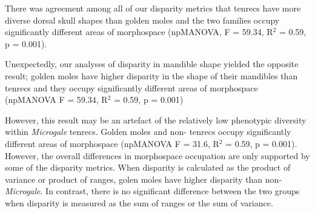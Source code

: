 \documentclass[12pt,a4paper]{article}
\begin{document}
There was agreement among all of our disparity metrics that tenrecs have more diverse dorsal skull shapes than golden moles and the two families occupy significantly different areas of morphospace (npMANOVA, F = 59.34, R$^2 $ = 0.59, p = 0.001). 



Unexpectedly, our analyses of disparity in mandible shape yielded the opposite result; golden moles have higher disparity in the shape of their mandibles than tenrecs and they occupy significantly different areas of morphospace (npMANOVA F = 59.34, R$^2$ = 0.59, p =	0.001)  

However, this result may be an artefact of the relatively low phenotypic diversity within \textit{Microgale} tenrecs. Golden moles and non- tenrecs occupy significantly different areas of morphospace (npMANOVA F = 31.6, R$^2$ = 0.59, p =	0.001). However, the overall differences in morphospace occupation are only supported by some of the disparity metrics. When disparity is calculated as the product of variance or product of ranges, golen moles have higher disparity than non-\textit{Microgale}. In contrast, there is no significant difference between the two groups when disparity is measured as the sum of ranges or the sum of variance. 





	
\end{document}

